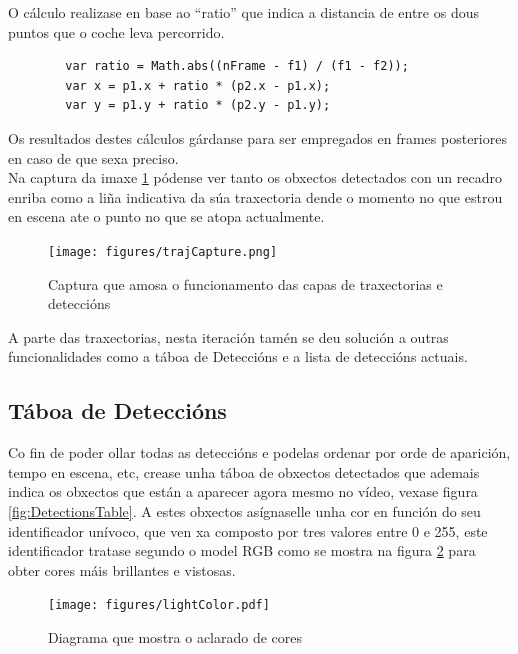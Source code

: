     O cálculo realizase en base ao ``ratio'' que indica a distancia de entre os dous puntos que o coche 
    leva percorrido.
    
    \begin{verbatim}
        var ratio = Math.abs((nFrame - f1) / (f1 - f2));
        var x = p1.x + ratio * (p2.x - p1.x);
        var y = p1.y + ratio * (p2.y - p1.y);    
    \end{verbatim}
    
    Os resultados destes cálculos gárdanse para ser empregados en frames posteriores en caso de que
    sexa preciso.\\
    
    Na captura da imaxe \ref{fig:trajCapture} pódense ver tanto os obxectos detectados con un 
    recadro enriba como a liña indicativa da súa traxectoria dende o momento no que estrou en 
    escena ate o punto no que se atopa actualmente.
    
    \begin{figure}[htp]
    \begin{center}
        \texttt{[image: figures/trajCapture.png]}
        \caption{Captura que amosa o funcionamento das capas de traxectorias e deteccións}
    \label{fig:trajCapture}
    \end{center}
    \end{figure}
    
    A parte das traxectorias, nesta iteración tamén se deu solución a outras funcionalidades como
    a táboa de Deteccións e a lista de deteccións actuais.

    \subsection{Táboa de Deteccións}

        Co fin de poder ollar todas as deteccións e podelas ordenar por orde de aparición, tempo en 
        escena, etc, crease unha táboa de obxectos detectados que ademais indica os obxectos que están
        a aparecer agora mesmo no vídeo, vexase figura \ref{fig:DetectionsTable}.
        A estes obxectos asígnaselle unha cor en función do seu 
        identificador unívoco, que ven xa composto por tres valores entre 0 e 255, este identificador
        tratase segundo o model RGB como se mostra na figura \ref{fig:lightColor} para obter cores
        máis brillantes e vistosas.
        
        \begin{figure}[htp]
        \begin{center}
            \texttt{[image: figures/lightColor.pdf]}
            \caption{Diagrama que mostra o aclarado de cores}
        \label{fig:lightColor}
        \end{center}
        \end{figure}

